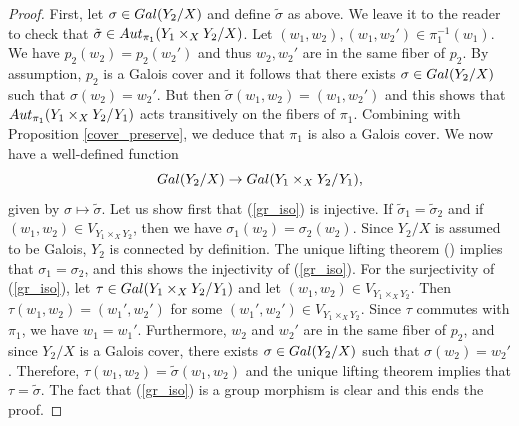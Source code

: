 \documentclass[11pt]{amsart}
\numberwithin{equation}{section}
\theoremstyle{remark}
\begin{document}
\begin{proof}
First, let $\sigma \in {\rm Gal}(Y_{2}/X)$ and define $\tilde{\sigma}$ as above.  We leave it to the reader to check that $\tilde{\sigma} \in {\rm Aut}_{\pi_{1}}(Y_{1}\times_{X}Y_{2}/X)$.  Let $(w_{1},w_{2}),(w_{1},w_{2}') \in \pi_{1}^{-1}(w_{1})$.  We have $p_{2}(w_{2}) = p_{2}(w_{2}')$ and thus $w_{2}, w_{2}'$ are in the same fiber of $p_{2}$.  By assumption, $p_{2}$ is a Galois cover and it follows that there exists $\sigma \in {\rm Gal}(Y_{2}/X)$ such that $\sigma(w_{2}) = w_{2}'$.  But then $\tilde{\sigma}(w_{1},w_{2}) = (w_{1},w_{2}')$ and this shows that ${\rm Aut}_{\pi_{1}}(Y_{1}\times_{X}Y_{2}/Y_{1})$ acts transitively on the fibers of $\pi_{1}$.  Combining with Proposition \ref{cover_preserve}, we deduce that $\pi_{1}$ is also a Galois cover.  We now have a well-defined function 
\begin{equation} \label{gr_iso}
{\rm Gal}(Y_{2}/X) \rightarrow {\rm Gal}(Y_{1}\times_{X}Y_{2}/Y_{1}),
\end{equation}
given by $\sigma \mapsto \tilde{\sigma}$.  Let us show first that (\ref{gr_iso}) is injective.  If $\tilde{\sigma}_{1} = \tilde{\sigma}_{2}$ and if $(w_{1},w_{2}) \in V_{Y_{1}\times_{X}Y_{2}}$, then we have $\sigma_{1}(w_{2}) = \sigma_{2}(w_{2})$.  Since $Y_{2}/X$ is assumed to be Galois, $Y_{2}$ is connected by definition.  The unique lifting theorem (\cite[Theorem 5.1]{Sunada:2013}) implies that $\sigma_{1} = \sigma_{2}$, and this shows the injectivity of (\ref{gr_iso}).  For the surjectivity of (\ref{gr_iso}), let $\tau \in {\rm Gal}(Y_{1}\times_{X}Y_{2}/Y_{1})$ and let $(w_{1},w_{2}) \in V_{Y_{1}\times_{X}Y_{2}}$.  Then $\tau(w_{1},w_{2}) = (w_{1}',w_{2}')$ for some $(w_{1}',w_{2}') \in V_{Y_{1}\times_{X}Y_{2}}$.  Since $\tau$ commutes with $\pi_{1}$, we have $w_{1} = w_{1}'$.  Furthermore, $w_{2}$ and $w_{2}'$ are in the same fiber of $p_{2}$, and since $Y_{2}/X$ is a Galois cover, there exists $\sigma \in {\rm Gal}(Y_{2}/X)$ such that $\sigma(w_{2}) = w_{2}'$.  Therefore, $\tau(w_{1},w_{2}) = \tilde{\sigma}(w_{1},w_{2})$ and the unique lifting theorem implies that $\tau = \tilde{\sigma}$.  The fact that (\ref{gr_iso}) is a group morphism is clear and this ends the proof.
\end{proof}
\end{document}
